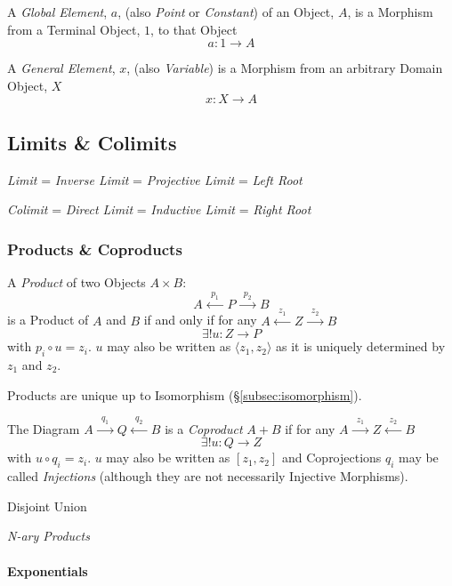 A \emph{Global Element}, $a$, (also \emph{Point} or \emph{Constant})
of an Object, $A$, is a Morphism from a Terminal Object, $1$, to that
Object
\[
    a: 1 \rightarrow A
\]

A \emph{General Element}, $x$, (also \emph{Variable}) is a Morphism
from an arbitrary Domain Object, $X$
\[
    x: X \rightarrow A
\]



\subsection{Limits \& Colimits}\label{subsec:category_limits}

\emph{Limit} = \emph{Inverse Limit} = \emph{Projective Limit} =
\emph{Left Root}

\emph{Colimit} = \emph{Direct Limit} = \emph{Inductive Limit} =
\emph{Right Root}



\subsubsection{Products \& Coproducts}\label{subsec:product_diagram}

A \emph{Product} of two Objects $A \times B$:
\[
    A \xleftarrow{\;\;p_1\;\;} P \xrightarrow{\;\;p_2\;\;} B
\]
is a Product of $A$ and $B$ if and only if for any $A
\xleftarrow{\;\;z_1\;\;} Z \xrightarrow{\;\;z_2\;\;} B$
\[
    \exists!u : Z \rightarrow P
\]
with $p_i \circ u = z_i$. $u$ may also be written as $\langle z_1, z_2
\rangle$ as it is uniquely determined by $z_1$ and $z_2$.

Products are unique up to Isomorphism (\S\ref{subsec:isomorphism}).

The Diagram $A \xrightarrow{\;\;q_1\;\;} Q \xleftarrow{\;\;q_2\;\;} B$
is a \emph{Coproduct} $A + B$ if for any $A \xrightarrow{\;\;z_1\;\;} Z
\xleftarrow{\;\;z_2\;\;} B$
\[
    \exists!u : Q \rightarrow Z
\]
with $u \circ q_i = z_i$. $u$ may also be written as $[ z_1, z_2 ]$
and Coprojections $q_i$ may be called \emph{Injections} (although they
are not necessarily Injective Morphisms).

Disjoint Union %

\emph{N-ary Products}

\paragraph{Exponentials}\label{subsec:category_exponential}



